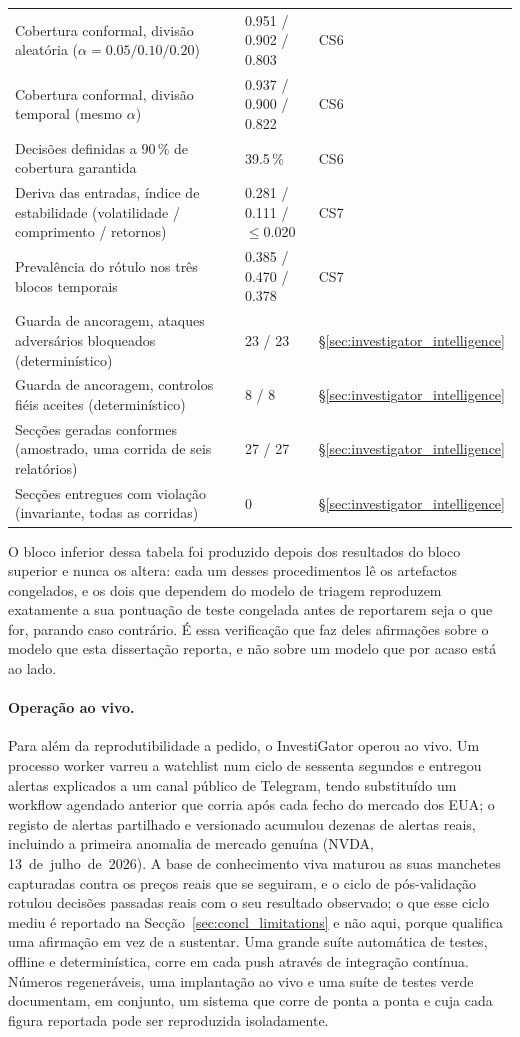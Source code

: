 \begin{table}[ht]
\begin{tabular}{p{7.0cm} l l}
Cobertura conformal, divisão aleatória ($\alpha = 0.05/0.10/0.20$) & 0.951 / 0.902 / 0.803 & CS6 \\
Cobertura conformal, divisão temporal (mesmo $\alpha$) & 0.937 / 0.900 / 0.822 & CS6 \\
Decisões definidas a 90\,\% de cobertura garantida & 39.5\,\% & CS6 \\
Deriva das entradas, índice de estabilidade (volatilidade / comprimento / retornos) & 0.281 / 0.111 / $\le$0.020 & CS7 \\
Prevalência do rótulo nos três blocos temporais & 0.385 / 0.470 / 0.378 & CS7 \\
\midrule
Guarda de ancoragem, ataques adversários bloqueados (determinístico) & 23 / 23 & §\ref{sec:investigator_intelligence} \\
Guarda de ancoragem, controlos fiéis aceites (determinístico) & 8 / 8 & §\ref{sec:investigator_intelligence} \\
Secções geradas conformes (amostrado, uma corrida de seis relatórios) & 27 / 27 & §\ref{sec:investigator_intelligence} \\
Secções entregues com violação (invariante, todas as corridas) & 0 & §\ref{sec:investigator_intelligence} \\
\bottomrule
\end{tabular}
\end{table}

O bloco inferior dessa tabela foi produzido depois dos resultados do bloco superior e nunca os
altera: cada um desses procedimentos lê os artefactos congelados, e os dois que dependem do modelo
de triagem reproduzem exatamente a sua pontuação de teste congelada antes de reportarem seja o que
for, parando caso contrário. É essa verificação que faz deles afirmações sobre o modelo que esta
dissertação reporta, e não sobre um modelo que por acaso está ao lado.

\paragraph{Operação ao vivo.} Para além da reprodutibilidade a pedido, o InvestiGator operou ao vivo.
Um processo worker varreu a watchlist num ciclo de sessenta segundos e entregou alertas explicados a
um canal público de Telegram, tendo substituído um workflow agendado anterior que corria após cada fecho
do mercado dos EUA; o registo de alertas partilhado e versionado acumulou dezenas de alertas
reais, incluindo a primeira anomalia de mercado genuína (NVDA, 13~de~julho~de~2026). A base de conhecimento
viva maturou as suas manchetes capturadas contra os preços reais que se seguiram, e o ciclo de
pós-validação rotulou decisões passadas reais com o seu resultado observado; o que esse ciclo mediu é
reportado na Secção~\ref{sec:concl_limitations} e não aqui, porque qualifica uma afirmação em vez de a
sustentar. Uma grande suíte automática de testes, offline e determinística, corre em cada push
através de integração contínua. Números regeneráveis, uma implantação ao vivo e uma suíte de testes verde
documentam, em conjunto, um sistema que
corre de ponta a ponta e cuja cada figura reportada pode ser reproduzida isoladamente.

